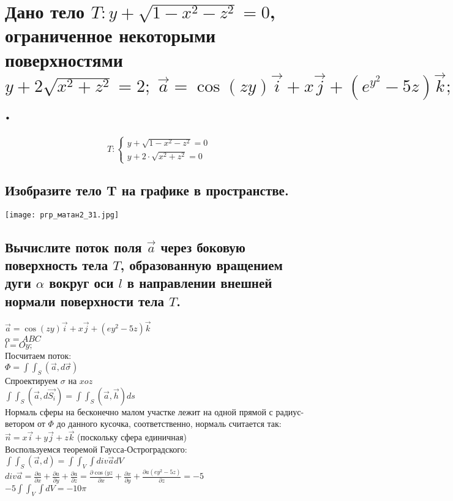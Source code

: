 \documentclass{article}
\begin{document}
\newpage
    \section{Дано тело $T: y + \sqrt{1 - x^2 - z^2} = 0$, ограниченное некоторыми поверхностями $y + 2\sqrt{x^2 + z^2} = 2; \; \overrightarrow{a} = \cos(zy) \overrightarrow{i} + x \overrightarrow{j} + (e^y^2 - 5z)\overrightarrow{k}; \; \alpha = ABC; \; l=Oy$.}
     \begin{equation*}
     T:
        \begin{cases}
            y + \sqrt{1-x^2-z^2} = 0 \\
            y + 2 \cdot \sqrt{x^2 + z^2} = 0
        \end{cases}
    \end{equation*}
    \subsection{Изобразите тело T на графике в пространстве.}
    \texttt{[image: ргр\_матан2\_31.jpg]} \\

    \subsection{Вычислите поток поля $\overrightarrow{a}$ через боковую поверхность тела $T$, образованную вращением дуги $\alpha$ вокруг оси $l$ в
    направлении внешней нормали поверхности тела $T$.}
    $\overrightarrow{a} = \cos(zy)\overrightarrow{i} + x\overrightarrow{j} + (e y^2 - 5z)\overrightarrow{k}$ \\
    $\alpha = ABC$ \\
    $l = Oy;$ \\
    Посчитаем поток: \\
    $\Phi =  \int\int_{S}{(\overrightarrow{a}, d\overrightarrow{\sigma})}$\\
    Спроектируем $\sigma$ на $xoz$\\
    $\int\int_{S}(\overrightarrow{a}, d \overrightarrow{S_i}) = \int\int_{S}(\overrightarrow{a},\overrightarrow{h}) ds$\\
    Нормаль сферы на бесконечно малом участке лежит на одной прямой с радиус-ветором от $\Phi$ до данного кусочка, соответственно, нормаль считается так: \\
    $\overrightarrow{n} = x\overrightarrow{i} + y\overrightarrow{j} + z\overrightarrow{k}$ (поскольку сфера единичная) \\
    Воспользуемся теоремой Гаусса-Остроградского: \\
    $ \int\int_{S}(\overrightarrow{a}, d) = \int\int_V\int div\overrightarrow{a}dV$ \\
    $div\overrightarrow{a} = \frac{\partial a}{\partial x} + \frac{\partial a}{\partial y} + \frac{\partial a}{\partial z}
    = \frac{\partial \cos(yz}{\partial x} + \frac{\partial x}{\partial y} + \frac{\partial a(ey^2 - 5z)}{\partial z} = -5$ \\
    $-5\int\int_{V}\int dV = -10\pi$ 
    
\end{document}

